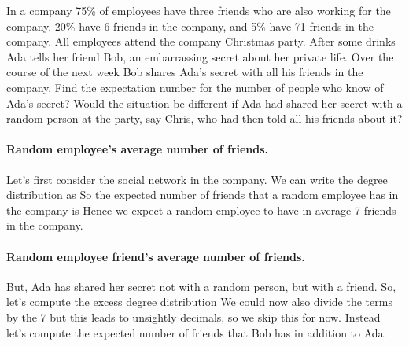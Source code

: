 
In a company 75\% of employees have three friends who are also working for the company. 20\% have 6 friends in the company, and 5\% have 71 friends in the company. All employees attend the company Christmas party. After some drinks Ada tells her friend Bob, an embarrassing secret about her private life. Over the course of the next week Bob shares Ada's secret with all his friends in the company. Find the expectation number for the number of people who know of Ada's secret?
Would the situation be different if Ada had shared her secret with a random person at the party, say Chris, who had then told all his friends about it?   

\solution
\paragraph{Random employee's average number of friends.}Let's first consider the social network in the company. We can write the degree distribution as  
So the expected number of friends that a random employee has in the company is 
Hence we expect a random employee to have in average 7 friends in the company. 
\paragraph{Random employee friend's average number of friends.} But, Ada has shared her secret not with a random person, but with a friend. So, let's compute the excess degree distribution 
We could now also divide the terms by the 7 but this leads to unsightly decimals, so we skip this for now. 
Instead let's compute the expected number of friends that Bob has in addition to Ada. 

